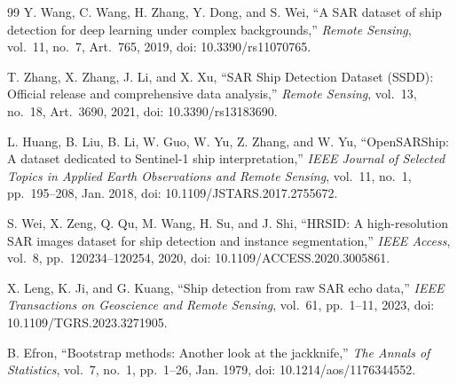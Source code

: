 \documentclass[journal]{IEEEtran}
\begin{document}
\begin{thebibliography}{99}
Y. Wang, C. Wang, H. Zhang, Y. Dong, and S. Wei, ``A SAR dataset of ship detection for deep learning under complex backgrounds,'' \emph{Remote Sensing}, vol.~11, no.~7, Art.~765, 2019, doi: 10.3390/rs11070765.

T. Zhang, X. Zhang, J. Li, and X. Xu, ``SAR Ship Detection Dataset (SSDD): Official release and comprehensive data analysis,'' \emph{Remote Sensing}, vol.~13, no.~18, Art.~3690, 2021, doi: 10.3390/rs13183690.

L. Huang, B. Liu, B. Li, W. Guo, W. Yu, Z. Zhang, and W. Yu, ``OpenSARShip: A dataset dedicated to Sentinel-1 ship interpretation,'' \emph{IEEE Journal of Selected Topics in Applied Earth Observations and Remote Sensing}, vol.~11, no.~1, pp.~195--208, Jan. 2018, doi: 10.1109/JSTARS.2017.2755672.

S. Wei, X. Zeng, Q. Qu, M. Wang, H. Su, and J. Shi, ``HRSID: A high-resolution SAR images dataset for ship detection and instance segmentation,'' \emph{IEEE Access}, vol.~8, pp.~120234--120254, 2020, doi: 10.1109/ACCESS.2020.3005861.

X. Leng, K. Ji, and G. Kuang, ``Ship detection from raw SAR echo data,'' \emph{IEEE Transactions on Geoscience and Remote Sensing}, vol.~61, pp.~1--11, 2023, doi: 10.1109/TGRS.2023.3271905.

B. Efron, ``Bootstrap methods: Another look at the jackknife,'' \emph{The Annals of Statistics}, vol.~7, no.~1, pp.~1--26, Jan. 1979, doi: 10.1214/aos/1176344552.

\end{thebibliography}
\endgroup
\end{document}
